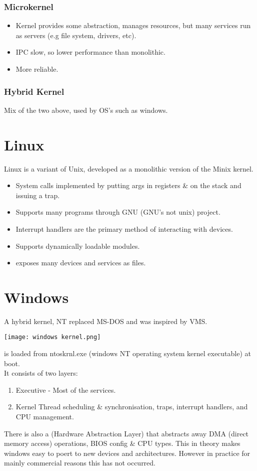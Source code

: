 \documentclass{report}
\begin{document}
        \subsubsection*{Microkernel}
            \begin{itemize}
                \item Kernel provides some abstraction, manages resources, but many services run as servers (e.g file system, drivers, etc).
                \item IPC slow, so lower performance than monolithic.
                \item More reliable.
            \end{itemize}
        \subsubsection*{Hybrid Kernel}
            Mix of the two above, used by OS's such as windows.
    \section*{Linux}
        Linux is a variant of Unix, developed as a monolithic version of the Minix kernel.
        \begin{itemize}    
            \item System calls implemented by putting args in registers \& on the stack and issuing a trap.
            \item Supports many programs through GNU (GNU's not unix) project.
            \item Interrupt handlers are the primary method of interacting with devices.
            \item Supports dynamically loadable modules.
            \item exposes many devices and services as files.
        \end{itemize}
    \section*{Windows}
        A hybrid kernel, NT replaced MS-DOS and was inspired by VMS.
        \begin{center}
            \texttt{[image: windows kernel.png]}
        \end{center}
         is loaded from ntoskrnl.exe (windows NT operating system kernel executable) at boot.
        \\ It consists of two layers:
        \begin{enumerate}
            \item Executive - Most of the services.
            \item Kernel Thread scheduling \& synchronisation, traps, interrupt handlers, and CPU management.
        \end{enumerate}
        There is also a  (Hardware Abstraction Layer) that abstracts away DMA (direct memory access) operations, BIOS config \& CPU types. This in theory makes windows easy to poert to new devices and architectures. However in practice for mainly commercial reasons this has not occurred.
\end{document}

